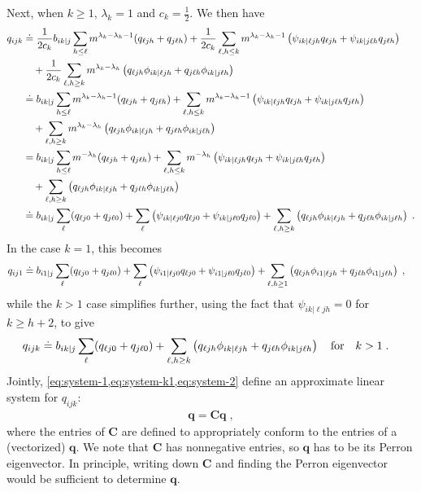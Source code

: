 Next, when $k \geq 1$, $\lambda_k = 1$ and $c_k = \frac{1}{2}$. We then have 
\begin{align}
    q_{ijk} &\doteq \frac{1}{2c_k}b_{ik|j} \sum_{h\leq \ell} m^{\lambda_k-\lambda_h-1} (q_{\ell jh} + q_{j\ell h}) + \frac{1}{2c_k}\sum_{\ell, h \leq k} m^{\lambda_k-\lambda_h-1}\left(\psi_{ik|\ell j h} q_{\ell jh} + \psi_{ik|j \ell h}q_{j \ell h}\right) \nonumber\\
    &\quad + \frac{1}{2c_k}\sum_{\ell, h\geq k} m^{\lambda_k-\lambda_h} \left(q_{\ell j h} \phi_{ik|\ell jh} + q_{j \ell h} \phi_{ik|j\ell h}\right) \\ 
    &\doteq b_{ik|j} \sum_{h\leq \ell} m^{\lambda_k-\lambda_h-1} (q_{\ell jh} + q_{j\ell h}) + \sum_{\ell, h \leq k} m^{\lambda_k-\lambda_h-1}\left(\psi_{ik|\ell j h} q_{\ell jh} + \psi_{ik|j \ell h}q_{j \ell h}\right) \nonumber\\
    &\quad + \sum_{\ell, h\geq k} m^{\lambda_k-\lambda_h} \left(q_{\ell j h} \phi_{ik|\ell jh} + q_{j \ell h} \phi_{ik|j\ell h}\right) \\ 
    &= b_{ik|j} \sum_{h\leq \ell} m^{-\lambda_h} (q_{\ell jh} + q_{j\ell h}) + \sum_{\ell, h \leq k} m^{-\lambda_h}\left(\psi_{ik|\ell j h} q_{\ell jh} + \psi_{ik|j \ell h}q_{j \ell h}\right) \nonumber\\
    &\quad + \sum_{\ell, h\geq k}  \left(q_{\ell j h} \phi_{ik|\ell jh} + q_{j \ell h} \phi_{ik|j\ell h}\right) \\ 
    &\doteq b_{ik|j} \sum_{\ell} (q_{\ell j0} + q_{j\ell 0}) + \sum_{\ell} \left(\psi_{ik|\ell j 0} q_{\ell j0} + \psi_{ik|j \ell 0}q_{j \ell 0}\right) + \sum_{\ell, h\geq k} \left(q_{\ell j h} \phi_{ik|\ell jh} + q_{j \ell h} \phi_{ik|j\ell h}\right)\;.
\end{align}
In the case $k=1$, this becomes 
\begin{align}
    q_{ij1} &\doteq b_{i1|j} \sum_{\ell}  (q_{\ell j0} + q_{j\ell 0}) +\sum_{\ell} \left(\psi_{i1|\ell j 0} q_{\ell j0} + \psi_{i1|j \ell 0}q_{j \ell 0}\right) +  \sum_{\ell, h\geq 1} \left(q_{\ell j h} \phi_{i1|\ell jh} + q_{j \ell h} \phi_{i1|j\ell h}\right) \label{eq:system-k1}\;,
\end{align}
while the $k>1$ case simplifies further, using the fact that
$\psi_{ik|\ell jh} = 0$ for $k \geq h+2$, 
to give
\begin{align}
    q_{ijk} &\doteq b_{ik|j} \sum_{\ell} (q_{\ell j0} + q_{j\ell 0}) + \sum_{\ell, h\geq k}  \left(q_{\ell j h} \phi_{ik|\ell jh} + q_{j \ell h} \phi_{ik|j\ell h}\right) \label{eq:system-2} \quad\mathrm{for}\quad k>1\;.
\end{align}
Jointly, \cref{eq:system-1,eq:system-k1,eq:system-2} define an approximate linear system for $q_{ijk}$: 
\begin{align}
    \mathbf{q} = \mathbf{C} \mathbf{q}\;,
\end{align}
where the entries of $\mathbf{C}$ are defined to appropriately conform to the entries of a (vectorized) $\mathbf{q}$. 
We note that $\mathbf{C}$ has nonnegative entries, so $\mathbf{q}$ has to be its Perron eigenvector. 
In principle, writing down $\mathbf{C}$ and finding the Perron eigenvector would be sufficient to determine $\mathbf{q}$. 

